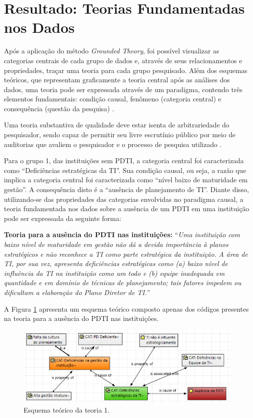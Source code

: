 \section{Resultado: Teorias Fundamentadas nos Dados}
\label{secao:resultado_teorias}
Após a aplicação do método \textit{Grounded Theory}, foi possível visualizar as categorias centrais de cada grupo de dados e, através de seus relacionamentos e propriedades, traçar uma teoria para cada grupo pesquisado. Além dos esquemas teóricos, que representam graficamente a teoria central após as análises dos dados, uma teoria pode ser expressada através de um paradigma, contendo três elementos fundamentais: condição causal, fenômeno (categoria central) e consequência (questão da pesquisa) \cite{corbin:98}.

Uma teoria substantiva de qualidade deve estar isenta de arbitrariedade do pesquisador, sendo capaz de permitir seu livre escrutínio público por meio de auditorias que avaliem o pesquisador e o processo de pesquisa utilizado \cite{bandeira:03}.

Para o grupo 1, das instituições sem PDTI, a categoria central foi caracterizada como ``Deficiências estratégicas da TI''. Sua condição causal, ou seja, a razão que implica a categoria central foi caracterizada como ``nível baixo de maturidade em gestão''. A consequência disto é a ``ausência de planejamento de TI''. Diante disso, utilizando-se das propriedades das categorias envolvidas no paradigma causal, a teoria fundamentada nos dados sobre a ausência de um PDTI em uma instituição pode ser expressada da seguinte forma:

\textbf{Teoria para a ausência do PDTI nas instituições:} ``\textit{Uma instituição com baixo nível de maturidade em gestão não dá a devida importância à planos estratégicos e não reconhece a TI como parte estratégica da instituição. A área de TI, por sua vez, apresenta deficiências estratégicas como (a) baixo nível de influência da TI na instituição como um todo e (b) equipe inadequada em quantidade e em domínio de técnicas de planejamento; tais fatores impedem ou dificultam a elaboração do Plano Diretor de TI.}''

A Figura \ref{figura:paradigma1} apresenta um esquema teórico composto apenas dos códigos presentes na teoria para a ausência do PDTI nas instituições.

\begin{figure}[h!]
\centering %
\includegraphics[width=13cm, frame]{figuras/paradigma1.PNG}
\caption{Esquema teórico da teoria 1.}
\label{figura:paradigma1}
\end{figure}


